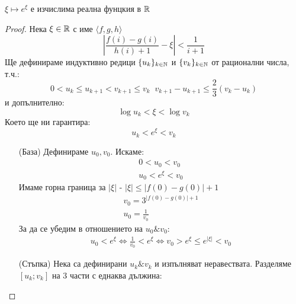 \begin{theorem}[Експоненциране]
    $\xi \mapsto e^\xi$ е изчислима реална фунцкия в ${\mathbb{R}}$
\end{theorem}
\begin{proof}
    Нека $\xi \in {\mathbb{R}}$ с име $\langle f, g, h \rangle$
    \begin{equation}
        \left|\frac{f(i) - g(i)}{h(i) + 1} - \xi \right| < \frac{1}{i+1}
    \end{equation}
    Ще дефинираме индуктивно редици $\{u_k\}_{k \in {\mathbb{N}}}$ и $\{v_k\}_{k \in {\mathbb{N}}}$ от рационални числа, т.ч.:
    \begin{equation}
        0 < u_k \leq u_{k+1} < v_{k+1} \leq v_k\;\; v_{k+1} - u_{k+1} \leq \frac{2}{3}(v_k - u_k)
    \end{equation}
    и допълнително:
    \begin{equation}
        \log u_k < \xi < \log v_k
    \end{equation}
    Което ще ни гарантира:
    \begin{equation}
        u_k < e^\xi < v_k
    \end{equation}
    \begin{itemize}
        \item[(База)] Дефинираме $u_0, v_0$. Искаме:
        \begin{eqnarray}
            0 < u_0 < v_0\\
            u_0 < e^\xi < v_0
        \end{eqnarray}
        Имаме горна граница за $|\xi|$ - $|\xi| \leq |f(0) - g(0)| + 1$
        \begin{eqnarray}
            v_0 = 3^{|f(0) - g(0)| + 1}\\
            u_0 = \frac{1}{v_0}
        \end{eqnarray}
        За да се убедим в отношението на $u_0 \& v_0$:
        \begin{eqnarray}
            u_0 < e^\xi \iff \frac{1}{v_0} < e^\xi \iff v_0 > e^\xi \leq e^{|\xi|} < v_0
        \end{eqnarray}
        \item[(Стъпка)] Нека са дефинирани $u_k \& v_k$ и изпълняват неравествата. Разделяме $[u_k;v_k]$ на 3 части с еднаква дължина:
        

\end{itemize}
\end{proof}
